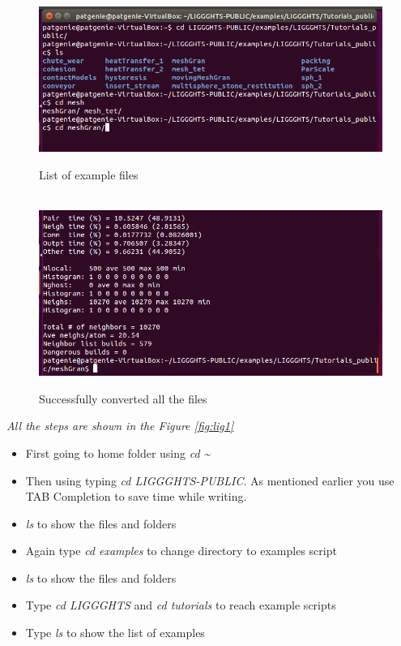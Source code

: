 \documentclass{tufte-book} %
\newcommand{\Li}{\textit{LIGGGHTS}\xspace}
\begin{document}
\begin{figure}
  \includegraphics[width=\linewidth]{graphics/Screenshot/Lig8.png}
  \caption[-14ex]{List of example files}
  \\\vspace{\baselineskip}
\includegraphics[width=\linewidth]{graphics/Screenshot/Lig13.png}
  \caption[-14ex]{Successfully converted all the files}
  \label{fig:lig8}
\end{figure}

\textit{All the steps are shown in the Figure \ref{fig:lig1}}
 \begin{itemize}
 \item First going to home folder using \textit{\emph{cd \~}}
 \item Then using typing \textit{\emph{cd \Li-PUBLIC}}. As mentioned earlier you use TAB Completion to save time while writing.
 \item \textit{\emph{ls}} to show the files and folders 
 \item Again type \textit{\emph{cd examples}} to change directory to examples script
 \item \textit{\emph{ls}} to show the files and folders
 \item Type \textit{\emph{cd \Li}} and \textit{\emph{cd tutorials}} to reach example scripts
   
 \item Type \textit{\emph{ls}} to show the list of examples
 \end{itemize}
\end{document}
